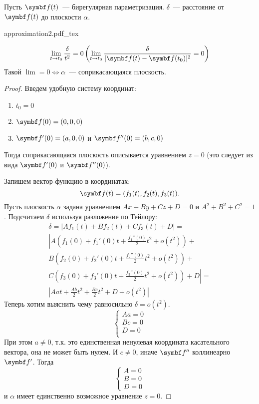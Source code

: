 \documentclass[main]{subfiles}
\begin{document}
\begin{theorem}
    Пусть $\vf(t)$~--- бирегулярная параметризация.
    $\delta$~--- расстояние от $\vf(t)$ до плоскости $\alpha$.
    \begin{center}
        {approximation2.pdf_tex}
    \end{center}
    \[\lim_{t \to t_0} \frac{\delta}{t^2} = 0 \left( \lim_{t \to t_0} \frac{\delta}{|\vf(t) - \vf(t_0)|^2} = 0 \right)\]
    Такой $\lim = 0 \Leftrightarrow \alpha$~--- соприкасающаяся плоскость.
\end{theorem}
\begin{proof}
    Введем удобную систему координат:
    \begin{enumerate}
        \item $t_0 = 0$
        \item $\vf(0) = (0,0,0)$
        \item $\vf'(0) = (a,0,0)$ и $\vf''(0) = (b,c,0)$
    \end{enumerate}
    Тогда соприкасающаяся плоскость описывается уравнением $z = 0$ (это следует из вида $\vf'(0)$ и $\vf''(0)$).

    Запишем вектор-функцию в координатах: \[\vf(t) = (f_1(t), f_2(t), f_3(t)).\]
    Пусть плоскость $\alpha$ задана уравнением $Ax+By+Cz+D = 0$ и $A^2 + B^2 + C^2 = 1$.
    Подсчитаем $\delta$ используя разложение по Тейлору:
    \begin{multline*}
        \delta = |Af_1(t) + Bf_2(t) + Cf_3(t) + D| =\\
        \left| A \left(f_1(0) + f_1'(0)t + \frac{f_1''(0)}{2}t^2 + o(t^2)\right) + \right.\\
        B \left(f_2(0) + f_2'(0)t + \frac{f_2''(0)}{2}t^2 + o(t^2)\right) + \\
        \left. C \left(f_3(0) + f_3'(0)t + \frac{f_3''(0)}{2}t^2 + o(t^2)\right) + D \right| = \\
        \left| Aat + \frac{Ab}{2} t^2 + \frac{Bc}{2}t^2 + D + o(t^2) \right|
    \end{multline*}
    Теперь хотим выяснить чему равносильно $\delta = o(t^2)$.
    \[\begin{cases}
            Aa = 0 \\
            Bc = 0 \\
            D = 0  \\
        \end{cases}\]
    При этом $a \neq 0$, т.к. это единственная ненулевая координата касательного вектора, она не может быть нулем.
    И $c \neq 0$, иначе $\vf''$ коллинеарно $\vf'$. Тогда
    \[\begin{cases}
            A = 0 \\
            B = 0 \\
            D = 0
        \end{cases}\]
    и $\alpha$ имеет единственно возможное уравнение $z = 0$.
\end{proof}
\end{document}
